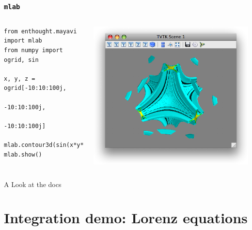 \documentclass[14pt,compress]{beamer}
\newcounter{time}
\newcommand{\inctime}[1]{\addtocounter{time}{#1}{\tiny \thetime\ m}}
\newcommand{\typ}[1]{\texttt{#1}}
\begin{document}
\begin{frame}[fragile]
    \frametitle{\typ{mlab}}
  \begin{columns}
    \hspace*{-0.45in}
      \footnotesize
\begin{lstlisting}
from enthought.mayavi import mlab
from numpy import ogrid, sin

x, y, z = ogrid[-10:10:100j, 
                -10:10:100j, 
                -10:10:100j]

mlab.contour3d(sin(x*y*z)/(x*y*z))
mlab.show()
\end{lstlisting}
    \hspace*{-0.1\linewidth}
    \includegraphics[width=1.18\linewidth]{data/mlab.png}
  \end{columns}
\end{frame}

\begin{frame}
    {A Look at the docs }

    \inctime{20}
\end{frame}


\section{Integration demo: Lorenz equations}
\end{document}
